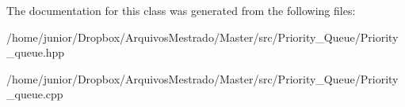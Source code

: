 The documentation for this class was generated from the following files\+:\begin{DoxyCompactItemize}
\item 
/home/junior/\+Dropbox/\+Arquivos\+Mestrado/\+Master/src/\+Priority\+\_\+\+Queue/Priority\+\_\+queue.\+hpp\item 
/home/junior/\+Dropbox/\+Arquivos\+Mestrado/\+Master/src/\+Priority\+\_\+\+Queue/Priority\+\_\+queue.\+cpp\end{DoxyCompactItemize}
